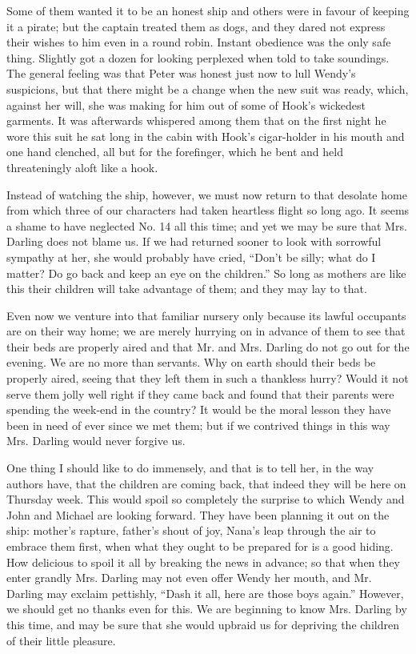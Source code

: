 Some of them wanted it to be an honest ship and others were in favour
of keeping it a pirate; but the captain treated them as dogs, and they
dared not express their wishes to him even in a round robin. Instant
obedience was the only safe thing. Slightly got a dozen for looking
perplexed when told to take soundings. The general feeling was that
Peter was honest just now to lull Wendy's suspicions, but that there
might be a change when the new suit was ready, which, against her will,
she was making for him out of some of Hook's wickedest garments. It was
afterwards whispered among them that on the first night he wore this
suit he sat long in the cabin with Hook's cigar-holder in his mouth and
one hand clenched, all but for the forefinger, which he bent and held
threateningly aloft like a hook.

Instead of watching the ship, however, we must now return to that
desolate home from which three of our characters had taken heartless
flight so long ago. It seems a shame to have neglected No. 14 all this
time; and yet we may be sure that Mrs. Darling does not blame us. If we
had returned sooner to look with sorrowful sympathy at her, she would
probably have cried, ``Don't be silly; what do I matter? Do go back and
keep an eye on the children.'' So long as mothers are like this their
children will take advantage of them; and they may lay to that.

Even now we venture into that familiar nursery only because its lawful
occupants are on their way home; we are merely hurrying on in advance
of them to see that their beds are properly aired and that Mr. and Mrs.
Darling do not go out for the evening. We are no more than servants.
Why on earth should their beds be properly aired, seeing that they left
them in such a thankless hurry? Would it not serve them jolly well
right if they came back and found that their parents were spending the
week-end in the country? It would be the moral lesson they have been in
need of ever since we met them; but if we contrived things in this way
Mrs. Darling would never forgive us.

One thing I should like to do immensely, and that is to tell her, in
the way authors have, that the children are coming back, that indeed
they will be here on Thursday week. This would spoil so completely the
surprise to which Wendy and John and Michael are looking forward. They
have been planning it out on the ship: mother's rapture, father's shout
of joy, Nana's leap through the air to embrace them first, when what
they ought to be prepared for is a good hiding. How delicious to spoil
it all by breaking the news in advance; so that when they enter grandly
Mrs. Darling may not even offer Wendy her mouth, and Mr. Darling may
exclaim pettishly, ``Dash it all, here are those boys again.'' However,
we should get no thanks even for this. We are beginning to know Mrs.
Darling by this time, and may be sure that she would upbraid us for
depriving the children of their little pleasure.

